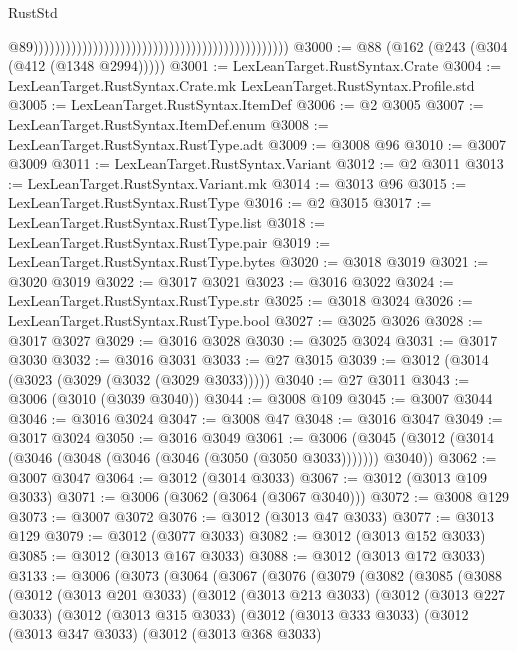 \begin{lexlean}{RustStd}
\begin{coremodule}
                                                                                                  @89)))))))))))))))))))))))))))))))))))))))))))))))
@3000 := @88 (@162 (@243 (@304 (@412 (@1348 @2994)))))
@3001 := LexLeanTarget.RustSyntax.Crate
@3004 := LexLeanTarget.RustSyntax.Crate.mk LexLeanTarget.RustSyntax.Profile.std
@3005 := LexLeanTarget.RustSyntax.ItemDef
@3006 := @2 @3005
@3007 := LexLeanTarget.RustSyntax.ItemDef.enum
@3008 := LexLeanTarget.RustSyntax.RustType.adt
@3009 := @3008 @96
@3010 := @3007 @3009
@3011 := LexLeanTarget.RustSyntax.Variant
@3012 := @2 @3011
@3013 := LexLeanTarget.RustSyntax.Variant.mk
@3014 := @3013 @96
@3015 := LexLeanTarget.RustSyntax.RustType
@3016 := @2 @3015
@3017 := LexLeanTarget.RustSyntax.RustType.list
@3018 := LexLeanTarget.RustSyntax.RustType.pair
@3019 := LexLeanTarget.RustSyntax.RustType.bytes
@3020 := @3018 @3019
@3021 := @3020 @3019
@3022 := @3017 @3021
@3023 := @3016 @3022
@3024 := LexLeanTarget.RustSyntax.RustType.str
@3025 := @3018 @3024
@3026 := LexLeanTarget.RustSyntax.RustType.bool
@3027 := @3025 @3026
@3028 := @3017 @3027
@3029 := @3016 @3028
@3030 := @3025 @3024
@3031 := @3017 @3030
@3032 := @3016 @3031
@3033 := @27 @3015
@3039 := @3012 (@3014 (@3023 (@3029 (@3032 (@3029 @3033)))))
@3040 := @27 @3011
@3043 := @3006 (@3010 (@3039 @3040))
@3044 := @3008 @109
@3045 := @3007 @3044
@3046 := @3016 @3024
@3047 := @3008 @47
@3048 := @3016 @3047
@3049 := @3017 @3024
@3050 := @3016 @3049
@3061 := @3006 (@3045 (@3012 (@3014 (@3046 (@3048 (@3046 (@3046 (@3050 (@3050 @3033))))))) @3040))
@3062 := @3007 @3047
@3064 := @3012 (@3014 @3033)
@3067 := @3012 (@3013 @109 @3033)
@3071 := @3006 (@3062 (@3064 (@3067 @3040)))
@3072 := @3008 @129
@3073 := @3007 @3072
@3076 := @3012 (@3013 @47 @3033)
@3077 := @3013 @129
@3079 := @3012 (@3077 @3033)
@3082 := @3012 (@3013 @152 @3033)
@3085 := @3012 (@3013 @167 @3033)
@3088 := @3012 (@3013 @172 @3033)
@3133 := @3006
    (@3073
      (@3064
        (@3067
          (@3076
            (@3079
              (@3082
                (@3085
                  (@3088
                    (@3012
                      (@3013 @201 @3033)
                      (@3012
                        (@3013 @213 @3033)
                        (@3012
                          (@3013 @227 @3033)
                          (@3012
                            (@3013 @315 @3033)
                            (@3012
                              (@3013 @333 @3033)
                              (@3012
                                (@3013 @347 @3033)
                                (@3012
                                  (@3013 @368 @3033)

\end{coremodule}
\end{lexlean}

